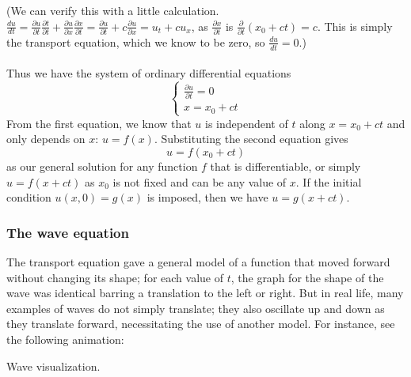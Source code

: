 \documentclass{article}
\begin{document}
(We can verify this with a little calculation. $\frac{du}{dt} = \frac{\partial u}{\partial t}\frac{\partial t}{\partial t} + \frac{\partial u}{\partial x}\frac{\partial x}{\partial t} = \frac{\partial u}{\partial t} + c\frac{\partial u}{\partial x} = u_t+cu_x$, as $\frac{\partial x}{\partial t}$ is $\frac{\partial}{\partial t} (x_0+ct)=c$. This is simply the transport equation, which we know to be zero, so $\frac{du}{dt}=0$.)
\\ \\
Thus we have the system of ordinary differential equations 
\begin{equation*}
    \begin{cases}
        \frac{\partial u}{\partial t} = 0 \\
        x = x_0 + ct
    \end{cases}
\end{equation*}
From the first equation, we know that $u$ is independent of $t$ along $x = x_0 + ct$ and only depends on $x$: $u = f(x)$. Substituting the second equation gives 
\begin{equation*}
    u=f(x_0+ct)
\end{equation*}
as our general solution for any function $f$ that is differentiable, or simply $u=f(x+ct)$ as $x_0$ is not fixed and can be any value of $x$. If the initial condition $u(x,0)=g(x)$ is imposed, then we have $u=g(x+ct)$.
\subsubsection{The wave equation}
The transport equation gave a general model of a function that moved forward without changing its shape; for each value of $t$, the graph for the shape of the wave was identical barring a translation to the left or right. But in real life, many examples of waves do not simply translate; they also oscillate up and down as they translate forward, necessitating the use of another model. For instance, see the following animation:
\begin{frame}{Wave visualization.}
\end{frame}
\end{document}
